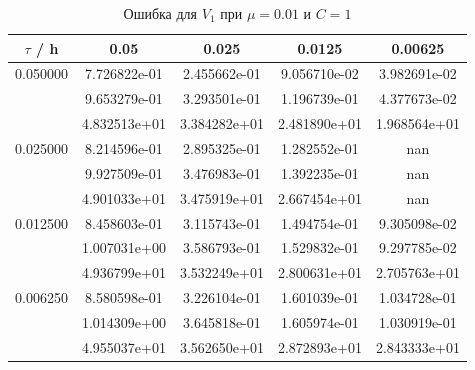\documentclass[specialist,subf,href,colorlinks=true,12pt
,times,mtpro,specialist
]{disser}
\begin{document}
\begin{table}[H]
\small
\caption{Ошибка для $V_1$ при $\mu=0.01$ и $C = 1$}
\begin{center}
\begin{tabular}{|c|c|c|c|c|}
\hline
$\tau$ / h & 0.05 & 0.025 & 0.0125 & 0.00625 \\
\hline
0.050000 & 7.726822e-01  & 2.455662e-01  & 9.056710e-02  & 3.982691e-02 \\
 & 9.653279e-01  & 3.293501e-01  & 1.196739e-01  & 4.377673e-02 \\
 & 4.832513e+01  & 3.384282e+01  & 2.481890e+01  & 1.968564e+01 \\
\hline
0.025000 & 8.214596e-01  & 2.895325e-01  & 1.282552e-01  & nan \\
 & 9.927509e-01  & 3.476983e-01  & 1.392235e-01  & nan \\
 & 4.901033e+01  & 3.475919e+01  & 2.667454e+01  & nan \\
\hline
0.012500 & 8.458603e-01  & 3.115743e-01  & 1.494754e-01  & 9.305098e-02 \\
 & 1.007031e+00  & 3.586793e-01  & 1.529832e-01  & 9.297785e-02 \\
 & 4.936799e+01  & 3.532249e+01  & 2.800631e+01  & 2.705763e+01 \\
\hline
0.006250 & 8.580598e-01  & 3.226104e-01  & 1.601039e-01  & 1.034728e-01 \\
 & 1.014309e+00  & 3.645818e-01  & 1.605974e-01  & 1.030919e-01 \\
 & 4.955037e+01  & 3.562650e+01  & 2.872893e+01  & 2.843333e+01 \\
\hline
\end{tabular}
\end{center}
\end{table}
\end{document}
